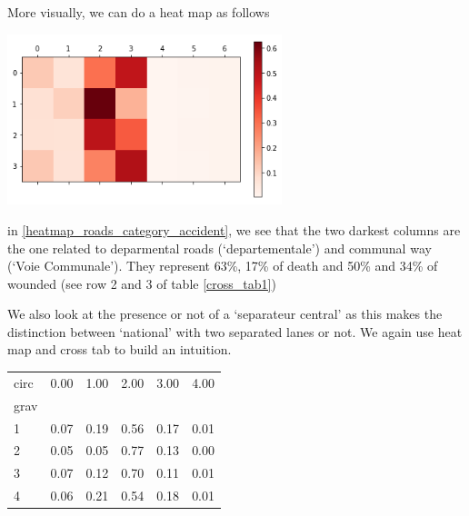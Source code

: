 \documentclass[a4paper]{article}
\theoremstyle{definition}
\theoremstyle{proposition}
\begin{document}
\vspace{0.5cm}
More visually, we can do a heat map as follows

\includegraphics[width=8cm]{heatmap_roads_category_accident.png}\label{heatmap_roads_category_accident}
\vspace{0.5cm}

in \ref{heatmap_roads_category_accident}, we see that  the two darkest columns are the one related to deparmental roads (`departementale') and communal way (`Voie Communale'). They represent 63\%, 17\% of death and 50\% and 34\% of wounded (see row 2 and 3 of table \ref{cross_tab1})

We also look at the presence or not of a `separateur central' as this makes the distinction between `national' with two separated lanes or not. We again use heat map and cross tab to build an intuition.
\begin{tabular}{lrrrrr}
\toprule
circ &  0.00 &  1.00 &  2.00 &  3.00 &  4.00 \\
grav &       &       &       &       &       \\
\midrule
1    &  0.07 &  0.19 &  0.56 &  0.17 &  0.01 \\
2    &  0.05 &  0.05 &  0.77 &  0.13 &  0.00 \\
3    &  0.07 &  0.12 &  0.70 &  0.11 &  0.01 \\
4    &  0.06 &  0.21 &  0.54 &  0.18 &  0.01 \\
\bottomrule
\end{tabular}
\end{document}
